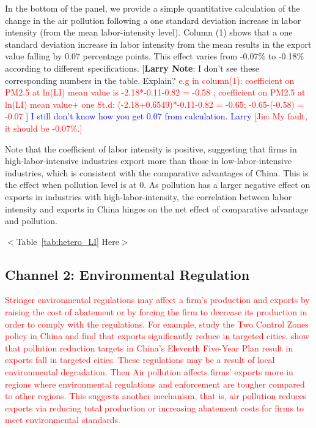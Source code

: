 \documentclass[12pt]{article}
\begin{document}
In the bottom of the panel, we provide a simple quantitative calculation of the change in the air pollution following
a one standard deviation increase in labor intensity (from the mean labor-intensity level). Column (1) shows that a one standard deviation increase in labor intensity from the mean results in the export value falling by 0.07 percentage points. This effect varies from -0.07\% to -0.18\% according to different
specifications.  [\textbf{Larry Note}: I don't see these corresponding
numbers in the table. Explain? \textcolor{red}{e.g in column(1): coefficient on PM2.5 at ln(LI) mean value is -2.18*-0.11-0.82 = -0.58 ; coefficient on PM2.5 at ln(LI) mean value+ one St.d: (-2.18+0.6549)*-0.11-0.82 = -0.65;  -0.65-(-0.58) = -0.07 }] \textcolor{blue}{I still don't know how you get 0.07 from calculation. Larry} \textcolor{red}{[Jie: My fault, it should be -0.07\%.]}

Note that the coefficient of labor intensity is positive, suggesting that
firms in high-labor-intensive industries export more than those in
low-labor-intensive industries, which is consistent with the comparative
advantages of China. This is the effect when pollution level is at 0. As
pollution has a larger negative effect on exports in industries with
high-labor-intensity, the correlation between labor intensity and exports
in China hinges on the net effect of comparative advantage and pollution.

\begin{center}
  $<$Table~\ref{tab:hetero_LI} Here$>$
  \end{center}

\subsection{Channel 2: Environmental Regulation}
\label{sec:Channel 2}
\textcolor{red}{Stringer environmental regulations may affect a firm's
production and exports by raising the cost of abatement or by 
forcing the firm to decrease its production in order to comply with the
regulations. For example, \cite%
{hering2014environmental} study the Two Control Zones policy in China and
find that exports significantly reduce in targeted cities. \cite%
{shi2018environmental} show that pollution reduction targets in China's
Eleventh Five-Year Plan result in exports fall in targeted cities. These regulations may be a result of local environmental degradation. Then Air pollution affects firms’ exports more in regions where
environmental regulations and enforcement are tougher compared to other regions. This suggests another mechanism, that is, air pollution reduces
exports via reducing total production or increasing abatement costs for firms to meet
environmental standards.}
\end{document}
